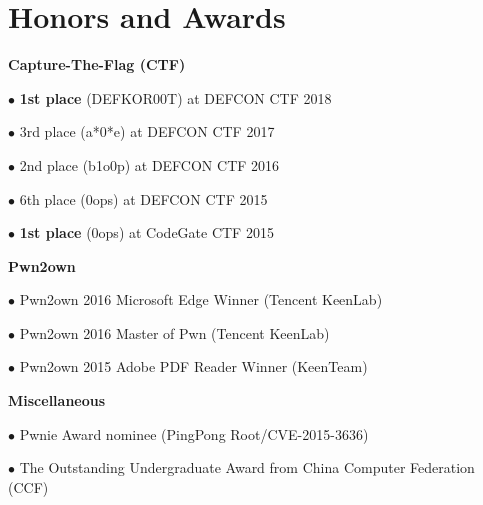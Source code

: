 \section*{Honors and Awards}
\begin{description}
\item{\bf {Capture-The-Flag (CTF)}}
	\item $\bullet$ \textbf{1st place} (DEFKOR00T) at DEFCON CTF 2018 
	\item $\bullet$ 3rd place (a*0*e) at DEFCON CTF 2017 
	\item $\bullet$ 2nd place (b1o0p) at DEFCON CTF 2016 
	\item $\bullet$ 6th place (0ops) at DEFCON CTF 2015 
	\item $\bullet$ \textbf{1st place} (0ops) at CodeGate CTF 2015 
\item{\bf {Pwn2own}}
	\item $\bullet$ Pwn2own 2016 Microsoft Edge Winner (Tencent KeenLab) 
	\item $\bullet$ Pwn2own 2016 Master of Pwn (Tencent KeenLab) 
	\item $\bullet$ Pwn2own 2015 Adobe PDF Reader Winner (KeenTeam) 
\item{\bf {Miscellaneous}}
	\item $\bullet$ Pwnie Award nominee (PingPong Root/CVE-2015-3636) 
	\item $\bullet$ The Outstanding Undergraduate Award from China Computer Federation (CCF) 
\end{description}
